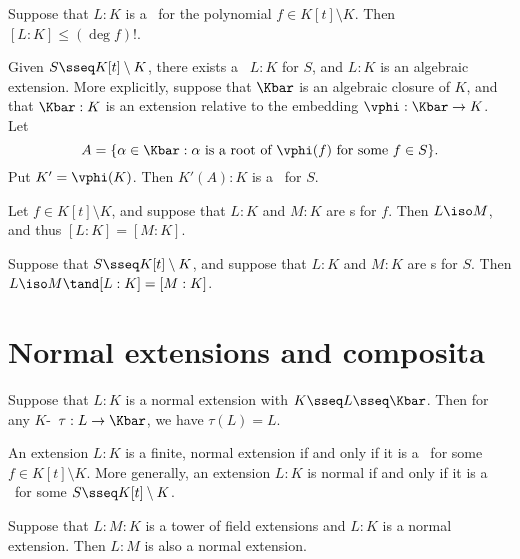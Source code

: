 \documentclass{article}
\begin{document}
  \begin{proposition}
    Suppose that $L:K$ is a \sfe~for the polynomial $f\in K[t]\setminus K$. Then $[L:K]\leq (\deg f)!$.
  \end{proposition}

  \begin{proposition}
    Given $S\sseq K[t]\setminus K$, there exists a \sfe~$L:K$ for $S$, and $L:K$ is an algebraic extension. More explicitly, suppose that $\Kbar$ is an algebraic closure of $K$, and that $\Kbar:K$ is an extension relative to the embedding $\vphi:\Kbar\to K$. Let
    \[
      A=\{ \alpha\in \Kbar : \alpha\text{ is a root of } \vphi(f) \text{ for some } f\in S \}.
    \]
    Put $K'=\vphi(K)$. Then $K'(A):K$ is a \sfe~for $S$.
  \end{proposition}

  \begin{theorem}
    Let $f\in K[t]\setminus K$, and suppose that $L:K$ and $M:K$ are \sfe s for $f$. Then $L\iso M$, and thus $[L:K]=[M:K]$.
  \end{theorem}

  \begin{theorem}
    Suppose that $S\sseq K[t]\setminus K$, and suppose that $L:K$ and $M:K$ are \sfe s for $S$. Then $L\iso M\tand [L:K]=[M:K]$.
  \end{theorem}

\section{Normal extensions and composita}
  \begin{proposition}
    Suppose that $L:K$ is a normal extension with $K\sseq L\sseq \Kbar$. Then for any $K$-\homo~$\tau:L\to \Kbar$, we have $\tau(L)=L$.
  \end{proposition}

  \begin{proposition}
    An extension $L:K$ is a finite, normal extension if and only if it is a \sfe~for some $f\in K[t]\setminus K$. More generally, an extension $L:K$ is normal if and only if it is a \sfe~for some $S\sseq K[t]\setminus K$.
  \end{proposition}

  \begin{proposition}
    Suppose that $L:M:K$ is a tower of field extensions and $L:K$ is a normal extension. Then $L:M$ is also a normal extension.
  \end{proposition}
\end{document}
